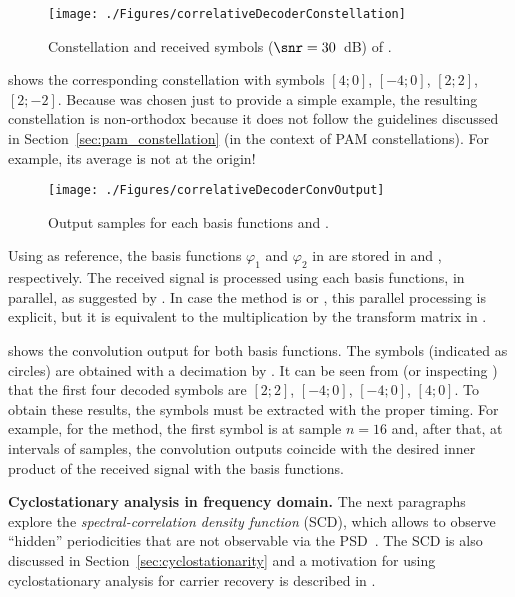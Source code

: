 \begin{figure}[htbp]
\centering
\texttt{[image: ./Figures/correlativeDecoderConstellation]}
\caption{Constellation and received symbols ($\snr=30$~dB) of .\label{fig:correlativeDecoderConstellation}}
\end{figure}

 shows the corresponding constellation 
with symbols $[4;0]$, $[-4;0]$, $[2;2]$, $[2;-2]$. Because  was chosen just to provide a simple example, the resulting  constellation is non-orthodox because it does not follow the guidelines discussed in Section~\ref{sec:pam_constellation} (in the context of PAM constellations). For example, its average is not at the origin!

\begin{figure}
\centering
\texttt{[image: ./Figures/correlativeDecoderConvOutput]}
\caption{Output samples for each basis functions and .\label{fig:correlativeDecoderConvOutput}}
\end{figure}

Using  as reference, the basis functions $\varphi_1$ and $\varphi_2$ in  are stored in  and , respectively. The received signal is processed using each basis functions, in parallel, as suggested by . In case the method is  or , this parallel processing is explicit, but it is equivalent to the multiplication by the transform matrix in .

 shows the convolution output for both basis functions. The symbols (indicated as circles) are obtained with a decimation by . It can be seen from  (or inspecting ) that the first four decoded symbols are $[2;2]$, $[-4;0]$, $[-4;0]$, $[4;0]$. To obtain these results, the symbols must be extracted with the proper timing. For example, for the  method, the first symbol is at sample $n=16$ and, after that, at intervals of  samples, the convolution outputs coincide with the desired inner product of the received signal  with the basis functions.
\eApplication

\bApplication \textbf{Cyclostationary analysis in frequency domain.}
\label{app:cyclostationary}
The next paragraphs explore the \emph{spectral-correlation density function} (SCD), which allows to observe ``hidden'' periodicities that are not observable via the PSD~\cite{Gardner91}. The SCD is also discussed in Section~\ref{sec:cyclostationarity} and a motivation for using cyclostationary analysis for carrier recovery is described in .

